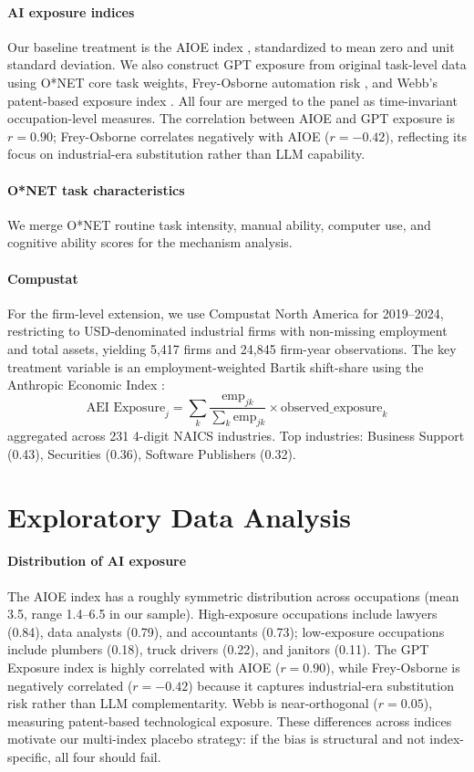 \documentclass[12pt,a4paper]{article}
\begin{document}
\paragraph{AI exposure indices} Our baseline treatment is the AIOE index \citep{felten2021}, standardized to mean zero and unit standard deviation. We also construct GPT exposure \citep{eloundou2024} from original task-level data using O*NET core task weights, Frey-Osborne automation risk \citep{fo2013}, and Webb's patent-based exposure index \citep{webb2020}. All four are merged to the panel as time-invariant occupation-level measures. The correlation between AIOE and GPT exposure is $r=0.90$; Frey-Osborne correlates negatively with AIOE ($r=-0.42$), reflecting its focus on industrial-era substitution rather than LLM capability.

\paragraph{O*NET task characteristics} We merge O*NET routine task intensity, manual ability, computer use, and cognitive ability scores for the mechanism analysis.

\paragraph{Compustat} For the firm-level extension, we use Compustat North America for 2019--2024, restricting to USD-denominated industrial firms with non-missing employment and total assets, yielding 5,417 firms and 24,845 firm-year observations. The key treatment variable is an employment-weighted Bartik shift-share using the Anthropic Economic Index \citep{massenkoff2026}:
\[
\text{AEI Exposure}_j = \sum_k \frac{\text{emp}_{jk}}{\sum_k \text{emp}_{jk}} \times \text{observed\_exposure}_k
\]
aggregated across 231 4-digit NAICS industries. Top industries: Business Support (0.43), Securities (0.36), Software Publishers (0.32).

\section{Exploratory Data Analysis}

\paragraph{Distribution of AI exposure} The AIOE index has a roughly symmetric distribution across occupations (mean 3.5, range 1.4--6.5 in our sample). High-exposure occupations include lawyers (0.84), data analysts (0.79), and accountants (0.73); low-exposure occupations include plumbers (0.18), truck drivers (0.22), and janitors (0.11). The GPT Exposure index is highly correlated with AIOE ($r=0.90$), while Frey-Osborne is negatively correlated ($r=-0.42$) because it captures industrial-era substitution risk rather than LLM complementarity. Webb is near-orthogonal ($r=0.05$), measuring patent-based technological exposure. These differences across indices motivate our multi-index placebo strategy: if the bias is structural and not index-specific, all four should fail.
\end{document}
